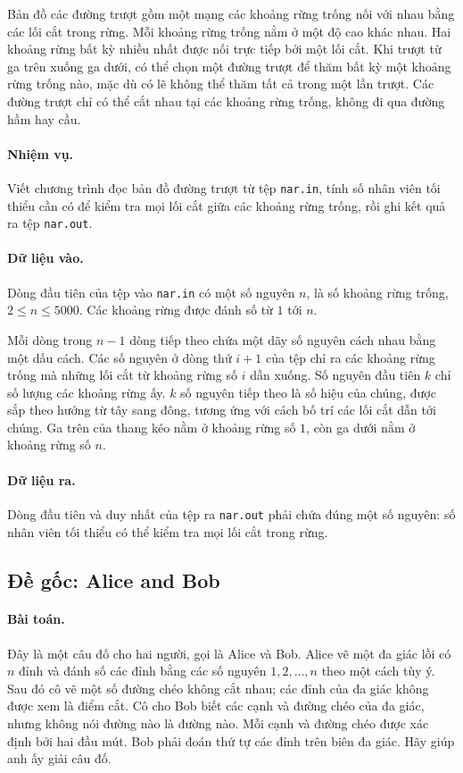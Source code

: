 \documentclass[11pt]{article}
\begin{document}
Bản đồ các đường trượt gồm một mạng các khoảng rừng trống nối với nhau bằng
các lối cắt trong rừng. Mỗi khoảng rừng trống nằm ở một độ cao khác nhau. Hai
khoảng rừng bất kỳ nhiều nhất được nối trực tiếp bởi một lối cắt. Khi trượt
từ ga trên xuống ga dưới, có thể chọn một đường trượt để thăm bất kỳ một
khoảng rừng trống nào, mặc dù có lẽ không thể thăm tất cả trong một lần trượt.
Các đường trượt chỉ có thể cắt nhau tại các khoảng rừng trống, không đi qua
đường hầm hay cầu.

\paragraph{Nhiệm vụ.}
Viết chương trình đọc bản đồ đường trượt từ tệp \texttt{nar.in}, tính số nhân
viên tối thiểu cần có để kiểm tra mọi lối cắt giữa các khoảng rừng trống, rồi
ghi kết quả ra tệp \texttt{nar.out}.

\paragraph{Dữ liệu vào.}
Dòng đầu tiên của tệp vào \texttt{nar.in} có một số nguyên \(n\), là số khoảng
rừng trống, \(2\le n\le 5000\). Các khoảng rừng được đánh số từ \(1\) tới
\(n\).

Mỗi dòng trong \(n-1\) dòng tiếp theo chứa một dãy số nguyên cách nhau bằng một
dấu cách. Các số nguyên ở dòng thứ \(i+1\) của tệp chỉ ra các khoảng rừng trống
mà những lối cắt từ khoảng rừng số \(i\) dẫn xuống. Số nguyên đầu tiên \(k\)
chỉ số lượng các khoảng rừng ấy. \(k\) số nguyên tiếp theo là số hiệu của
chúng, được sắp theo hướng từ tây sang đông, tương ứng với cách bố trí các lối
cắt dẫn tới chúng. Ga trên của thang kéo nằm ở khoảng rừng số \(1\), còn ga
dưới nằm ở khoảng rừng số \(n\).

\paragraph{Dữ liệu ra.}
Dòng đầu tiên và duy nhất của tệp ra \texttt{nar.out} phải chứa đúng một số
nguyên: số nhân viên tối thiểu có thể kiểm tra mọi lối cắt trong rừng.

\subsection{Đề gốc: Alice and Bob}

\paragraph{Bài toán.}
Đây là một câu đố cho hai người, gọi là Alice và Bob. Alice vẽ một đa giác lồi
có \(n\) đỉnh và đánh số các đỉnh bằng các số nguyên \(1,2,\ldots,n\) theo một
cách tùy ý. Sau đó cô vẽ một số đường chéo không cắt nhau; các đỉnh của đa
giác không được xem là điểm cắt. Cô cho Bob biết các cạnh và đường chéo của đa
giác, nhưng không nói đường nào là đường nào. Mỗi cạnh và đường chéo được xác
định bởi hai đầu mút. Bob phải đoán thứ tự các đỉnh trên biên đa giác. Hãy giúp
anh ấy giải câu đố.
\end{document}
